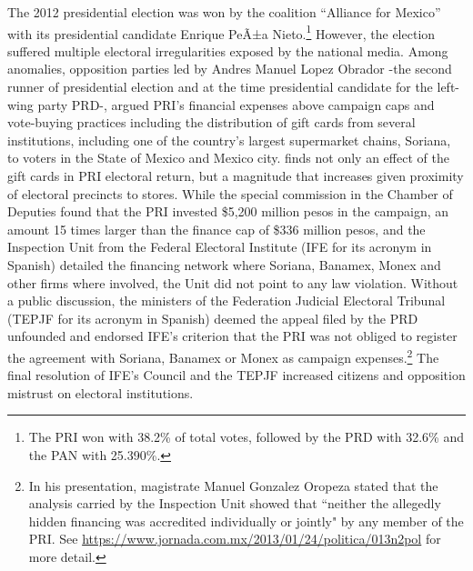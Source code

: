 \documentclass[12pt]{amsart}
\numberwithin{equation}{section}
\theoremstyle{definition}
\theoremstyle{definition}
\theoremstyle{definition}
\begin{document}
\begin{appendix}
  The 2012 presidential election was won by the coalition ``Alliance for Mexico'' with its presidential candidate Enrique PeÃ±a Nieto.\footnote{The PRI won with 38.2\% of total votes, followed by the PRD with 32.6\% and the PAN with 25.390\%.} However, the election suffered multiple electoral irregularities exposed by the national media. Among anomalies, opposition parties led by Andres Manuel Lopez Obrador -the second runner of presidential election and at the time presidential candidate for the left-wing party PRD-, argued PRI's financial expenses above campaign caps and vote-buying practices including the distribution of gift cards from several institutions, including one of the country's largest supermarket chains, Soriana, to voters in the State of Mexico and Mexico city. \citet{cantu_2019} finds not only an effect of the gift cards in PRI electoral return, but a magnitude that increases given proximity of electoral precincts to stores. While the special commission in the Chamber of Deputies found that the PRI invested \$5,200 million pesos in the campaign, an amount 15 times larger than the finance cap of \$336 million pesos, and the Inspection Unit from the Federal Electoral Institute (IFE for its acronym in Spanish) detailed the financing network where Soriana, Banamex, Monex and other firms where involved, the Unit did not point to any law violation. Without a public discussion, the ministers of the Federation Judicial Electoral Tribunal (TEPJF for its acronym in Spanish) deemed the appeal filed by the PRD unfounded and endorsed IFE's  criterion that the PRI was not obliged to register the agreement with Soriana, Banamex or Monex as campaign expenses.\footnote{In his presentation, magistrate Manuel Gonzalez Oropeza stated that the analysis carried by the Inspection Unit showed that ``neither the allegedly hidden financing was accredited individually or jointly" by any member of the PRI. See \url{https://www.jornada.com.mx/2013/01/24/politica/013n2pol} for more detail.} The final resolution of IFE's Council and the TEPJF increased citizens and opposition mistrust on electoral institutions. 


\end{appendix}
\end{document}
